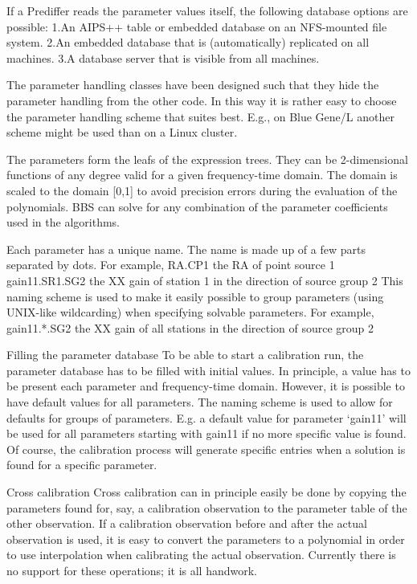 \documentclass[10pt]{lofar}
\begin{document}
If a Prediffer reads the parameter values itself, the following database options are possible:
1.An AIPS++ table or embedded database on an NFS-mounted file system.
2.An embedded database that is (automatically) replicated on all machines.
3.A database server that is visible from all machines.

The parameter handling classes have been designed such that they hide the parameter handling from the other code. In this way it is rather easy to choose the parameter handling scheme that suites best. E.g., on Blue Gene/L another scheme might be used than on a Linux cluster.

The parameters form the leafs of the expression trees. They can be 2-dimensional functions of any degree valid for a given frequency-time domain. The domain is scaled to the domain [0,1] to avoid precision errors during the evaluation of the polynomials.
BBS can solve for any combination of the parameter coefficients used in the algorithms.

Each parameter has a unique name. The name is made up of a few parts separated by dots.
For example,
RA.CP1          the RA of point source 1
gain11.SR1.SG2      the XX gain of station 1 in the direction of source group 2
This naming scheme is used to make it easily possible to group parameters (using UNIX-like wildcarding) when specifying solvable parameters.
For example,
gain11.*.SG2        the XX gain of all stations in the direction of source group 2


Filling the parameter database
To be able to start a calibration run, the parameter database has to be filled with initial values. In principle, a value has to be present each parameter and frequency-time domain. However, it is possible to have default values for all parameters. The naming scheme is used to allow for defaults for groups of parameters.
E.g. a default value for parameter ‘gain11’ will be used for all parameters starting with gain11 if no more specific value is found.
Of course, the calibration process will generate specific entries when a solution is found for a specific parameter.

Cross calibration
Cross calibration can in principle easily be done by copying the parameters found for, say, a calibration observation to the parameter table of the other observation. If a calibration observation before and after the actual observation is used, it is easy to convert the parameters to a polynomial in order to use interpolation when calibrating the actual observation.
Currently there is no support for these operations; it is all handwork.
\end{document}
